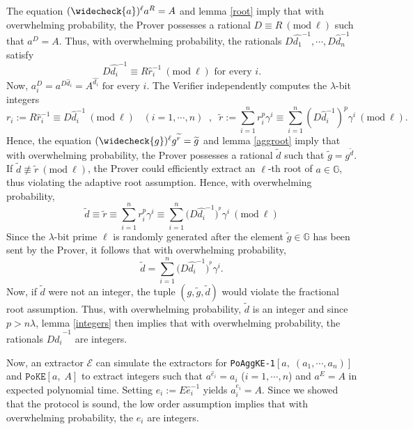 \documentclass[11pt, lettersize, notitlepage, leqno, footskip=0.6cm]{article}
\newcommand{\slim}{\sum\limits}
\newcommand{\ttt}{\texttt}
\newcommand{\bG}{\mathbb{G}}
\newcommand{\wti}{\widetilde}
\newcommand{\mc}{\mathcal}
\newcommand{\lam}{\lambda}
\newcommand{\what}{\widehat}
\newcommand{\weck}{\widecheck}
\newcommand{\vs}{\vspace{-0.15cm}}
\newcommand{\op}{overwhelming probability}
\newcommand{\Mod}[1]{\ (\mathrm{mod}\ #1)}
\newcommand{\E}{\mc{E}}
\numberwithin{equation}{section}
\begin{document}
\begin{prf}
The equation $(\weck{a})^{\ell}a^R= A$ and lemma \ref{root} imply that with \op, the Prover possesses a rational $D\equiv R\Mod{\ell}$ such that $a^D = A$. Thus, with \op, the rationals $D\what{d_1}^{-1},\cdots,D\what{d}_n^{-1}$ satisfy \vs $$D\what{d_i}^{-1}\equiv R\what{r}_i^{-1}\Mod{\ell} \text{ for every }i.$$ Now, $a_i^{D} = a^{D\what{d}_i} = A^{\what{d_i}} \text{ for every }i.$ The Verifier independently computes the $\lam$-bit integers \vs $$r_i:= R\what{r}_{i}^{-1}\equiv D\what{d}_i^{-1}\Mod{\ell}\;\;\;(i=1,\cdots,n)\;\;,\;\;\wti{r}:= {\slim_{i=1}^n r_i^{p}\gamma^i}\equiv {\slim_{i=1}^n (D\what{d}_i^{-1})^{p}\gamma^i}\Mod{\ell}.$$ Hence, the equation $(\weck{g})^{\ell}g^{\wti{r}} = \wti{g}$ and lemma \ref{aggroot} imply that with \op, the Prover possesses a rational $\wti{d}$ such that $\wti{g} = g^{\wti{d}}$. If $\wti{d}\not\equiv\wti{r}\Mod{\ell}$, the Prover could efficiently extract an $\ell$-th root of $a\in\bG$, thus violating the adaptive root assumption. Hence, with \op, \vs $$\wti{d}\equiv \wti{r}\equiv \slim_{i=1}^n r_i^{{p}}\gamma^i \equiv   \slim_{i=1}^n \big(D\what{d_i}^{-1}\big)^{^{p}}\gamma^i \Mod{\ell}$$ Since the $\lam$-bit prime $\ell$ is randomly generated after the element $\wti{g}\in\bG$ has been sent by the Prover, it follows that with \op, \vs $$\wti{d} = \slim_{i=1}^n \big(D\what{d_i}^{-1}\big)^{^{p}}\gamma^i. $$ Now, if $\wti{d}$ were not an integer, the tuple $(g, \wti{g}, \wti{d})$ would violate the fractional root assumption. Thus, with \op, $\wti{d}$ is an integer and since $p > n\lam$, lemma \ref{integers} then implies that with \op, the rationals $D\what{d_i}^{-1}$ are integers.

Now, an extractor $\E$ can simulate the extractors for \verb|PoAggKE-1|$[a,\;(a_1,\cdots,a_n)]$ and $\ttt{PoKE}[a,\; A]$ to extract integers such that $a^{\what{e}_i} = a_i$ ($i=1,\cdots,n$) and $a^E = A$ in expected polynomial time. Setting $e_i:= E\what{e}_i^{-1}$ yields $a_i^{e_i} = A$. Since we showed that the protocol is sound, the low order assumption implies that with \op, the $e_i$ are integers. \end{prf}

\end{document}
